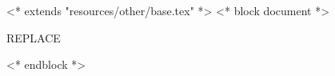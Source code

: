 <* extends "resources/other/base.tex" *>
<* block document *>
\pagestyle{fancy}
\lhead{\titlename}
\cfoot{\thepage}


REPLACE

<* endblock *>
